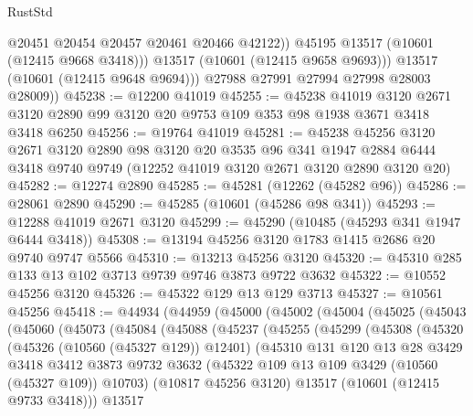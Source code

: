 \begin{lexlean}{RustStd}
\begin{coremodule}
                  @20451
                  @20454
                  @20457
                  @20461
                  @20466
                  @42122))
              @45195
              @13517
              (@10601 (@12415 @9668 @3418)))
            @13517
            (@10601 (@12415 @9658 @9693)))
          @13517
          (@10601 (@12415 @9648 @9694)))
        @27988
        @27991
        @27994
        @27998
        @28003
        @28009))
@45238 := @12200 @41019
@45255 := @45238
    @41019
    @3120
    @2671
    @3120
    @2890
    @99
    @3120
    @20
    @9753
    @109
    @353
    @98
    @1938
    @3671
    @3418
    @3418
    @6250
@45256 := @19764 @41019
@45281 := @45238
    @45256
    @3120
    @2671
    @3120
    @2890
    @98
    @3120
    @20
    @3535
    @96
    @341
    @1947
    @2884
    @6444
    @3418
    @9740
    @9749
    (@12252 @41019 @3120 @2671 @3120 @2890 @3120 @20)
@45282 := @12274 @2890
@45285 := @45281 (@12262 (@45282 @96))
@45286 := @28061 @2890
@45290 := @45285 (@10601 (@45286 @98 @341))
@45293 := @12288 @41019 @2671 @3120
@45299 := @45290 (@10485 (@45293 @341 @1947 @6444 @3418))
@45308 := @13194 @45256 @3120 @1783 @1415 @2686 @20 @9740 @9747 @5566
@45310 := @13213 @45256 @3120
@45320 := @45310 @285 @133 @13 @102 @3713 @9739 @9746 @3873 @9722 @3632
@45322 := @10552 @45256 @3120
@45326 := @45322 @129 @13 @129 @3713
@45327 := @10561 @45256
@45418 := @44934
    (@44959
      (@45000
        (@45002
          (@45004
            (@45025
              (@45043
                (@45060
                  (@45073
                    (@45084
                      (@45088
                        (@45237
                          (@45255
                            (@45299
                              (@45308
                                (@45320
                                  (@45326 (@10560 (@45327 @129)) @12401)
                                  (@45310
                                    @131
                                    @120
                                    @13
                                    @28
                                    @3429
                                    @3418
                                    @3412
                                    @3873
                                    @9732
                                    @3632
                                    (@45322 @109 @13 @109 @3429 (@10560 (@45327 @109)) @10703)
                                    (@10817 @45256 @3120)
                                    @13517
                                    (@10601 (@12415 @9733 @3418)))
                                  @13517

\end{coremodule}
\end{lexlean}

